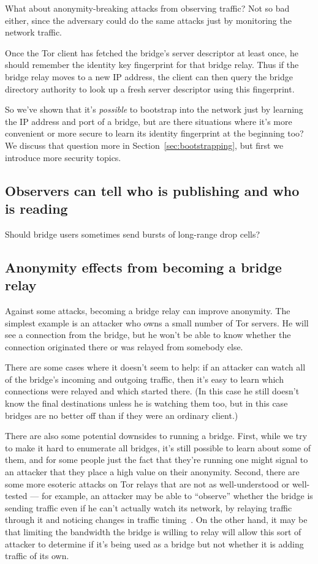 \documentclass{llncs}
\begin{document}
What about anonymity-breaking attacks from observing traffic? Not so bad
either, since the adversary could do the same attacks just by monitoring
the network traffic.

Once the Tor client has fetched the bridge's server descriptor at least
once, he should remember the identity key fingerprint for that bridge
relay. Thus if the bridge relay moves to a new IP address, the client
can then query the bridge directory authority to look up a fresh server
descriptor using this fingerprint.

So we've shown that it's \emph{possible} to bootstrap into the network
just by learning the IP address and port of a bridge, but are there
situations where it's more convenient or more secure to learn its
identity fingerprint at the beginning too? We discuss that question
more in Section~\ref{sec:bootstrapping}, but first we introduce more
security topics.

\subsection{Observers can tell who is publishing and who is reading}
\label{subsec:upload-padding}

Should bridge users sometimes send bursts of long-range drop cells?

\subsection{Anonymity effects from becoming a bridge relay}

Against some attacks, becoming a bridge relay can improve anonymity. The
simplest example is an attacker who owns a small number of Tor servers. He
will see a connection from the bridge, but he won't be able to know
whether the connection originated there or was relayed from somebody else.

There are some cases where it doesn't seem to help: if an attacker can
watch all of the bridge's incoming and outgoing traffic, then it's easy
to learn which connections were relayed and which started there. (In this
case he still doesn't know the final destinations unless he is watching
them too, but in this case bridges are no better off than if they were
an ordinary client.)

There are also some potential downsides to running a bridge. First, while
we try to make it hard to enumerate all bridges, it's still possible to
learn about some of them, and for some people just the fact that they're
running one might signal to an attacker that they place a high value
on their anonymity. Second, there are some more esoteric attacks on Tor
relays that are not as well-understood or well-tested --- for example, an
attacker may be able to ``observe'' whether the bridge is sending traffic
even if he can't actually watch its network, by relaying traffic through
it and noticing changes in traffic timing~\cite{attack-tor-oak05}. On
the other hand, it may be that limiting the bandwidth the bridge is
willing to relay will allow this sort of attacker to determine if it's
being used as a bridge but not whether it is adding traffic of its own.
\end{document}

